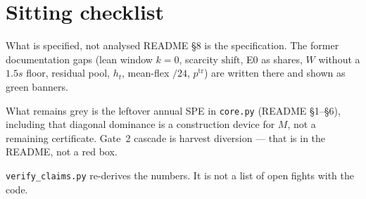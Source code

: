 \section{Sitting checklist}

\begin{frame}{What is specified, not analysed}
README \S8 is the specification. The former documentation gaps (lean
window $k=0$, scarcity $\mathrm{shift}$, E0 as shares, $W$ without a
$1.5s$ floor, residual pool, $h_t$, mean-flex $/24$, $p^{\mathrm{tr}}$)
are written there and shown as green banners.

What remains grey is the leftover annual SPE in \texttt{core.py}
(README \S1--\S6), including that diagonal dominance is a construction
device for $M$, not a remaining certificate. Gate~2 cascade is harvest
diversion --- that is in the README, not a red box.

\texttt{verify\_claims.py} re-derives the numbers. It is not a list of
open fights with the code.
\end{frame}

